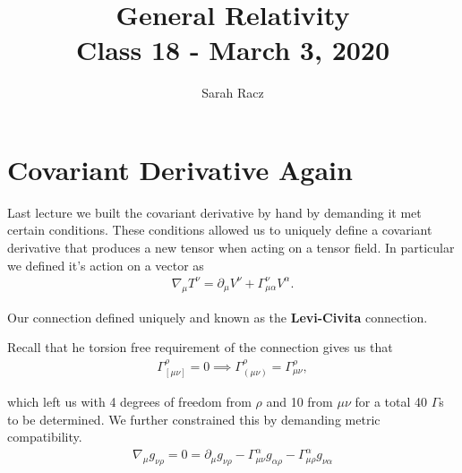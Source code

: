 \documentclass[10pt]{article}
\title{{\Huge General Relativity}\\{\Large{Class  18 - March 3, 2020}}} %
\author{Sarah Racz}
\begin{document}
    \maketitle
    \flushbottom
    \newpage
    \pagestyle{fancynotes}
	
	\section{Covariant Derivative Again}
	Last lecture we built the covariant derivative by hand by demanding it met certain conditions. These conditions allowed us to uniquely define a covariant derivative that produces a new tensor when acting on a tensor field. In particular we defined it's action on a vector as 
	\begin{align}
            \nabla_{\mu} T^{\nu} = \partial_{\mu} V^{\nu} + \Gamma^{\nu}_{\mu \alpha} V^{\alpha}.
            \end{align}
            
           Our connection defined uniquely and known as the \textbf{Levi-Civita} connection. 
            
            Recall that he torsion free requirement of the connection gives us that 
            \begin{align}
            \Gamma^{\rho}_{\left[ \mu \nu \right] } = 0 \implies \Gamma^{\rho}_{( \mu \nu ) }  = \Gamma^{\rho}_{ \mu \nu } ,
            \end{align}
            
            which left us with 4 degrees of freedom from $\rho$ and 10 from $\mu \nu$ for a total 40 $\Gamma$s to be determined. We further constrained this by demanding metric compatibility. 
            \begin{align}
            \nabla_\mu g_{\nu \rho} = 0 = \partial_\mu g_{\nu \rho}  - \Gamma^{\alpha}_{\mu \nu} g_{\alpha \rho} - \Gamma^{\alpha}_{\mu \rho} g_{\nu \alpha}
            \end{align}
            
\end{document}
